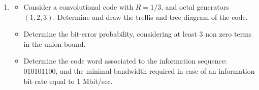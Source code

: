 \documentclass[11pt]{article}
\begin{document}
\begin{enumerate}
\item
\begin{itemize}
\item  Consider a convolutional code with $R=1/3$, and octal generators $(1,2,3)$. Determine and draw the trellis and tree diagram of the code. 
\item Determine the bit-error probability, considering at least 3 non zero terms in the union bound.
\item Determine the code word associated to the information sequence: $010101100$, and the minimal bandwidth required in case of an information bit-rate equal to 1 Mbit/sec.\\
\end{itemize}

\end{enumerate}

\end{document}
